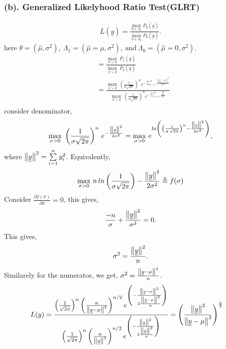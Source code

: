 \documentclass[a4paper,english,12pt]{article}
\begin{document}
\subsubsection*{(b). Generalized Likelyhood Ratio Test(GLRT)}
\begin{align*}
L(\underline{y})=\frac{\underset{\theta \in \Lambda_1}{\max} P_\theta \left( \underline{y} \right)}{\underset{\theta \in \Lambda_0}{\max} P_\theta \left( \underline{y} \right)}.
\end{align*}
here $\theta = (\hat{\mu},\sigma^2),~\Lambda_1 =(\hat{\mu}=\mu,\sigma^2),~\mbox{and}~\Lambda_0 = (\hat{\mu}=0,\sigma^2)$.\\
\begin{align*}
&=\frac{\underset{\sigma >0}{\max}~P_1(\underline{y})}{\underset{\sigma >0}{\max}~P_0(\underline{y})}\\
&=\frac{\underset{\sigma >0}{\max}~\left(\frac{1}{\sigma \sqrt{2\pi}}\right)^n e^{- \sum \limits_{i=1}^n \frac{(y_i-\mu)^2}{2\sigma^2}}}{\underset{\sigma >0}{\max}~\left(\frac{1}{\sigma \sqrt{2\pi}}\right)^n e^{- \sum \limits_{i=1}^n\frac{y_i^2}{2\sigma^2}}}\\
\end{align*}
consider denominator,
\begin{equation*}
\underset{\sigma >0}{\max}~\left(\frac{1}{\sigma \sqrt{2\pi}}\right)^n \, e^{-\frac{ \left\lVert\underline{y}\right\rVert^2}{2 \sigma^2}}=\underset{\sigma >0}{\max}~e^{\ln\left(\left(\frac{1}{\sigma\, \sqrt{2 \pi}}\right)^n - \frac{\left\lVert\underline{y}\right\rVert^2}{2\sigma^2}\right)},
\end{equation*}
where $\left\lVert\underline{y}\right\rVert^2=\sum \limits_{i=1}^n y_i^2$. Equivalently,
\begin{equation*}
\underset{\sigma >0}{\max}~n\,ln\left(\frac{1}{\sigma \sqrt{2 \pi}}\right)-\frac{\left\lVert\underline{y}\right\rVert^2}{2\sigma^2}\triangleq f(\sigma)
\end{equation*}
Consider $\frac{\partial f(\sigma)}{\partial \sigma}=0$, this gives,
\begin{equation*}
\frac{-n}{\sigma }+\frac{\left\lVert\underline{y}\right\rVert^2}{\sigma^3}=0.
\end{equation*}
This gives,
\begin{equation*}
\sigma^2 = \frac{\left\lVert\underline{y}\right\rVert^2}{n}.
\end{equation*}
Similarely for the numerator, we get, $\sigma^2=\frac{\left\lVert\underline{y}-\mu\right\rVert^2}{n}$.
\begin{align*}
L(y)&=\frac{\left(\frac{1}{\sqrt{2\pi}}\right)^n \left(\frac{n}{\left\lVert\underline{y}-\mu\right\rVert^2}\right)^{n/2}e^{\left(-\frac{ \left\lVert\underline{y}-\mu\right\rVert^2}{2 \frac{\left\lVert\underline{y}-\mu\right\rVert^2}{n}} \right)}}{\left(\frac{1}{\sqrt{2\pi}}\right)^n \left(\frac{n}{\left\lVert\underline{y}\right\rVert^2}\right)^{n/2}e^{\left(-\frac{ \left\lVert\underline{y}\right\rVert^2}{2 \frac{\left\lVert\underline{y}\right\rVert^2}{n}} \right)}}=\left(\frac{\left\lVert\underline{y}\right\rVert^2}{\left\lVert\underline{y}-\mu\right\rVert^2}\right)^{\frac{n}{2}}
\end{align*}
\end{document}
